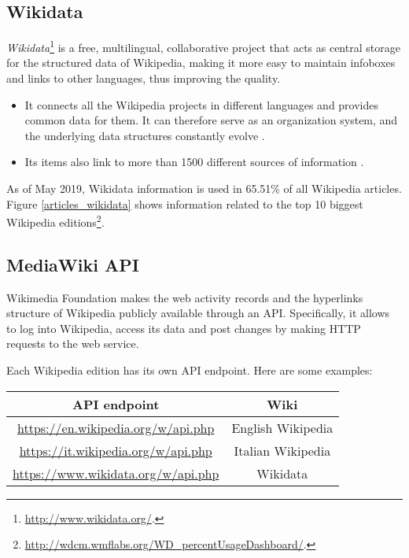         \subsection{Wikidata}
            \emph{Wikidata}\footnote{\url{http://www.wikidata.org/}.} is a free, multilingual, collaborative project that acts as central storage for the structured data of Wikipedia, making it more easy to maintain infoboxes and links to other languages, thus improving the quality.
            \begin{itemize}
                \item It connects all the Wikipedia projects in different languages and provides common data for them. It can therefore serve as an organization system, and the underlying data structures constantly evolve \cite{NeubertOrganization}.
                \item Its items also link to more than 1500 different sources of information \cite{NeubertLinking}.
            \end{itemize}
            
            
            
            As of May 2019, Wikidata information is used in 65.51\% of all Wikipedia articles. Figure \ref{articles_wikidata} shows information related to the top 10 biggest Wikipedia editions\footnote{\url{http://wdcm.wmflabs.org/WD_percentUsageDashboard/}.}.
        \subsection{MediaWiki API}
            Wikimedia Foundation makes the web activity records and the hyperlinks structure of Wikipedia publicly available through an API. Specifically, it allows to log into Wikipedia, access its data and post changes by making HTTP requests to the web service.
            
            Each Wikipedia edition has its own API endpoint. Here are some examples:
            
            \begin{center}
                \begin{tabular}{|c|c|}
                    \hline
                    API endpoint & Wiki  \\
                    \hline \hline
                    \url{https://en.wikipedia.org/w/api.php} & English Wikipedia \\ \hline
                    \url{https://it.wikipedia.org/w/api.php} & Italian Wikipedia \\ \hline
                    \url{https://www.wikidata.org/w/api.php} & Wikidata \\ \hline
                \end{tabular}
            \end{center}
